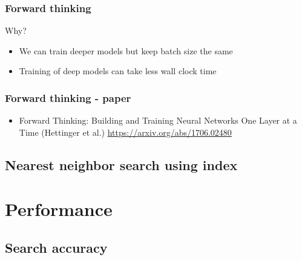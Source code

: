 \documentclass{beamer}
\begin{document}
  \begin{frame}
    \frametitle{Forward thinking} 
    \Large Why?
   	\begin{itemize}
		\item We can train deeper models but keep batch size the same
		\item Training of deep models can take less wall clock time
	\end{itemize}
  \end{frame}    
  
  \begin{frame}
    \frametitle{Forward thinking - paper}  
   	\begin{itemize}
		\item Forward Thinking: Building and Training Neural Networks One Layer at a Time
 (Hettinger et al.) \url{https://arxiv.org/abs/1706.02480}
	\end{itemize}   
  \end{frame}  
  
\subsection{Nearest neighbor search using index}

  \section{Performance}
\subsection{Search accuracy}
  
\end{document}
